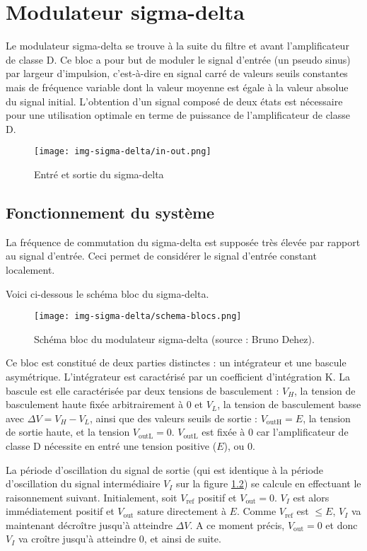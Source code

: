 \chapter{Modulateur sigma-delta}
\label{sec:sigma-delta}
Le modulateur sigma-delta se trouve à la suite du filtre et avant l'amplificateur de classe D. 
Ce bloc a pour but de moduler le signal d'entrée (un pseudo sinus) par largeur d'impulsion,
c'est-à-dire en signal carré de valeurs seuils constantes mais de fréquence variable dont la
valeur moyenne est égale à la valeur absolue du signal initial. L'obtention d'un signal composé
de deux états est nécessaire pour une utilisation optimale en terme de puissance de l'amplificateur de classe D.

\begin{figure}[ht]
	\centering
	\texttt{[image: img-sigma-delta/in-out.png]}
	\caption{Entré et sortie du sigma-delta}
	\label{fig:entrée-sortie-sigma-delta}
\end{figure}

\section{Fonctionnement du système}
La fréquence de commutation du sigma-delta est supposée très élevée par rapport
au signal d'entrée. Ceci permet de considérer le signal d'entrée constant localement.

Voici ci-dessous le schéma bloc du sigma-delta.

\begin{figure}[ht]
	\centering
	\texttt{[image: img-sigma-delta/schema-blocs.png]}
	\caption{Schéma bloc du modulateur sigma-delta (source : Bruno Dehez).}
	\label{fig:sigma-delta-schema-blocs}
\end{figure}

Ce bloc est constitué de deux parties distinctes : un intégrateur et une bascule asymétrique.
L'intégrateur est caractérisé par un coefficient d'intégration K. La bascule est elle caractérisée
par deux tensions de basculement : $V_H$, la tension de basculement haute fixée arbitrairement à 0 
et $V_L$, la tension de basculement basse avec $\Delta V = V_H - V_L$, ainsi que des valeurs seuils
de sortie : $V_{\text{outH}} = E$, la tension de sortie haute, et la tension $V_{\text{outL}} = 0$. 
$V_{\text{outL}}$ est fixée à 0 car l'amplificateur de classe D nécessite en entré une tension positive ($E$), ou 0.

La période d'oscillation du signal de sortie (qui est 
identique à la période d'oscillation du signal intermédiaire
$V_I$ sur la figure \ref{fig:sigma-delta-schema-blocs})
se calcule en effectuant le raisonnement suivant.
Initialement, soit $V_{\text{ref}}$ positif et
$V_{\text{out}} = 0$. $V_I$ est alors immédiatement positif
et $V_{\text{out}}$ sature directement à $E$. Comme $V_{\text{ref}}$
est $\leq E$, $V_I$ va maintenant décroître jusqu'à atteindre
$\Delta V$. A ce moment précis, $V_{\text{out}} = 0$
et donc $V_I$ va croître jusqu'à atteindre 0, et ainsi de suite.

